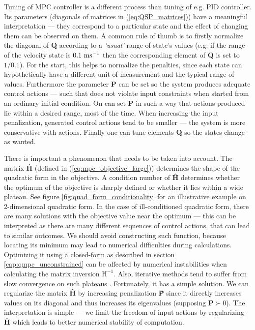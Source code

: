 Tuning of MPC controller is a different process than tuning of e.g. PID controller. Its parameters (diagonals of matrices in (\ref{eq:QSP_matrices})) have a meaningful interpretation --- they correspond to a particular state and the effect of changing them can be observed on them. A common rule of thumb is to firstly normalize the diagonal of \textbf{Q} according to a \textit{'usual'} range of state's values (e.g. if the range of the velocity state is $0.1~\mathrm{ms^{-1}}$ then the corresponding element of \textbf{Q} is set to $1/0.1$). For the start, this helps to normalize the penalties, since each state can hypothetically have a different unit of measurement and the typical range of values. Furthermore the parameter \textbf{P} can be set so the system produces adequate control actions --- such that does not violate input constraints when started from an ordinary initial condition. On can set \textbf{P} in such a way that actions produced lie within a desired range, most of the time. When increasing the input penalization, generated control actions tend to be smaller --- the system is more conservative with actions. Finally one can tune elements \textbf{Q} so the states change as wanted.

There is important a phenomenon that needs to be taken into account. The matrix \textbf{\^H} (defined in (\ref{eq:mpc_objective_large})) determines the shape of the quadratic form in the objective. A condition number of \textbf{\^H} determines whether the optimum of the objective is sharply defined or whether it lies within a wide plateau. See figure \ref{fig:quad_form_conditionality} for an illustrative example on 2-dimensional quadratic form. In the case of ill-conditioned quadratic form, there are many solutions with the objective value near the optimum --- this can be interpreted as there are many different sequences of control actions, that can lead to similar outcomes. We should avoid constructing such function, because locating its minimum may lead to numerical difficulties during calculations. Optimizing it using a closed-form as described in section \ref{cap:qmpc_unconstrained} can be affected by numerical instabilities when calculating the matrix inversion $\textbf{\^H}^{-1}$. Also, iterative methods tend to suffer from slow convergence on such plateaus \citep{boyd2004convex}. Fortunately, it has a simple solution. We can regularize the matrix \textbf{\^H} by increasing penalization \textbf{\^P} since it directly increases values on its diagonal and thus increases its eigenvalues (supposing $\textbf{\^P} \succ 0$). The interpretation is simple --- we limit the freedom of input actions by regularizing \textbf{\^H} which leads to better numerical stability of computation.

